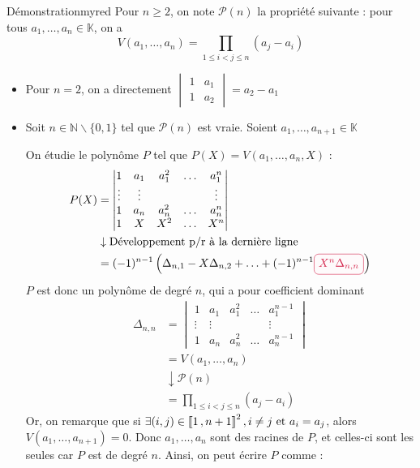     \begin{demo}{Démonstration}{myred}
        Pour $n \geq 2$, on note $\mathcal{P}(n)$ la propriété suivante : pour tous $a_1,\ldots,a_n \in \mathbb{K}$, on a
        \[ V(a_1,\ldots,a_n) = \prod\limits_{1 \leq i < j \leq n} (a_j - a_i) \] 
    \begin{itemize}
    \item Pour $n = 2$, on a directement $\begin{vmatrix}
        1 & a_1 \\
        1 & a_2
    \end{vmatrix} = a_2 - a_1$
    \item Soit $n \in \mathbb{N} \backslash \{ 0,1 \}$ tel que $\mathcal{P}(n)$ est vraie.  Soient $a_1,\ldots,a_{n+1} \in \mathbb{K}$
    
    On étudie le polynôme $P$ tel que $P(X) = V(a_1,\ldots,a_n,X)$ : 
    \begin{align*}
        P(X) &= \begin{vmatrix}
            1 & a_1 & a_1^2 & \ldots & a_1^{n} \\
            \vdots & \vdots &  &  & \vdots \\
            1 & a_n & a_n^2 & \ldots & a_n^{n} \\
            1 & X  & X^2 & \ldots & X^n
        \end{vmatrix} \\
        & \downarrow \text{Développement p/r à la dernière ligne} \\
        &= (-1)^{n-1} \left( \Delta_{n,1} - X \Delta_{n,2} + \ldots + (-1)^{n-1} \lilbox{myred}{$X^n \Delta_{n,n}$} \right)
    \end{align*}
    $P$ est donc un polynôme de degré $n$, qui a pour coefficient dominant 
    \begin{align*}
        \Delta_{n,n} &= \begin{vmatrix}
            1 & a_1 & a_1^2 & \ldots & a_1^{n-1} \\
            \vdots & \vdots &  &  & \vdots \\
            1 & a_n & a_n^2 & \ldots & a_n^{n-1}
        \end{vmatrix} \\
        &= V(a_1,\ldots,a_n) \\
        & \downarrow \mathcal{P}(n) \\
        &= \prod\limits_{1 \leq i < j \leq n} (a_j - a_i)
    \end{align*}
    Or, on remarque que si $\exists (i,j) \in \left\llbracket 1 \, , n+1 \right\rrbracket^2, i \neq j \text{ et } a_i = a_j$, alors $V(a_1,\ldots,a_{n+1}) = 0$. Donc $a_1,\ldots,a_n$ sont des racines de $P$, et celles-ci sont les seules car $P$ est de degré $n$. Ainsi, on peut écrire $P$ comme : 

\end{itemize}
\end{demo}
